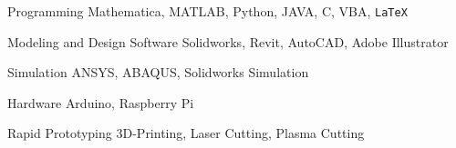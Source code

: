 

\begin{cvskills}

  \cvskill
    {Programming} %
    {Mathematica, MATLAB, Python, JAVA, C, VBA, \texttt{\LaTeX}} %

  \cvskill
    {Modeling and Design Software} %
    {Solidworks, Revit, AutoCAD, Adobe Illustrator} %

  \cvskill
    {Simulation} %
    {ANSYS, ABAQUS, Solidworks Simulation} %

  \cvskill
    {Hardware} %
    {Arduino, Raspberry Pi} %
    
  \cvskill
    {Rapid Prototyping} %
    {3D-Printing, Laser Cutting, Plasma Cutting} %

\end{cvskills}
